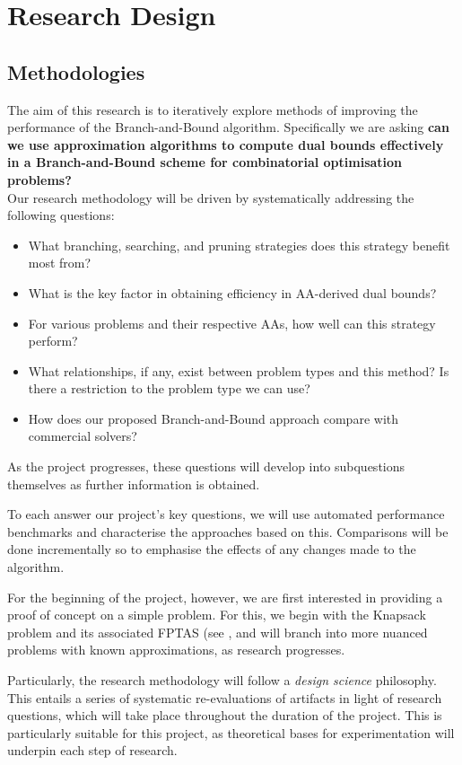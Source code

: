 \documentclass[12pt, a4paper]{article}
\begin{document}
\section{Research Design}

\subsection{Methodologies}

The aim of this research is to iteratively explore methods of improving the performance of the Branch-and-Bound algorithm. Specifically we are asking \textbf{can we use approximation algorithms to compute dual bounds effectively in a Branch-and-Bound scheme for combinatorial optimisation problems?}\\
Our research methodology will be driven by systematically addressing the following questions:

\begin{itemize}
\item What branching, searching, and pruning strategies does this strategy benefit most from?
\item What is the key factor in obtaining efficiency in AA-derived dual bounds?
\item For various problems and their respective AAs, how well can this strategy perform?
\item What relationships, if any, exist between problem types and this method? Is there a restriction to the problem type we can use?
\item How does our proposed Branch-and-Bound approach compare with commercial solvers?
\end{itemize}

As the project progresses, these questions will develop into subquestions themselves as further information is obtained.

To each answer our project's key questions, we will use automated performance benchmarks and characterise the approaches based on this. Comparisons will be done incrementally so to emphasise the effects of any changes made to the algorithm.  

For the beginning of the project, however, we are first interested in providing a proof of concept on a simple problem. For this, we begin with the Knapsack \cite{PisingerKP} problem and its associated FPTAS (see \cite{BOOK:2}, and will branch into more nuanced problems with known approximations, as research progresses.


Particularly, the research methodology will follow a \textit{design science} philosophy. This entails a series of systematic re-evaluations of artifacts in light of research questions, which will take place throughout the duration of the project. This is particularly suitable for this project, as theoretical bases for experimentation will underpin each step of research. 
\end{document}
